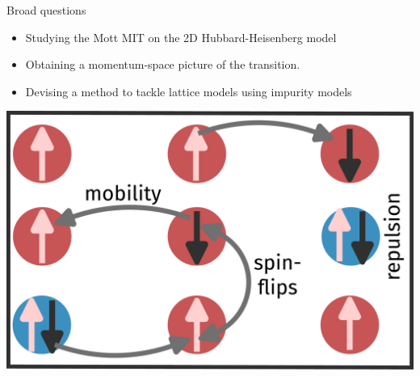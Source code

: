 \documentclass[aspectratio=169,t]{beamer}
\begin{document}
\begin{frame}{Broad questions}

\vspace*{\fill}
\begin{minipage}{0.5\textwidth}
\begin{itemize}[<+->]
	\item Studying the \alert{Mott MIT} on the 2D Hubbard-Heisenberg model\\[10pt]
	\item Obtaining a \alert{momentum-space} picture of the transition.\\[10pt]
	\item Devising a method to tackle lattice models \alert{using impurity models}
\end{itemize}
\end{minipage}
\hspace*{\fill}
\begin{minipage}{0.4\textwidth}
\includegraphics[width=\textwidth]{hubbard.pdf}
\end{minipage}

\vspace*{\fill}
\end{frame}
\end{document}
